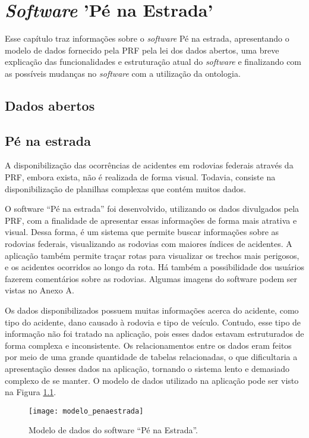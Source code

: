 \chapter{\textit{Software} 'Pé na Estrada'}
  
  Esse capítulo traz informações sobre o \textit{software} Pé na estrada, apresentando o modelo de dados fornecido pela PRF
  pela lei dos dados abertos, uma breve explicação das funcionalidades e estruturação atual do \textit{software} e finalizando 
  com as possíveis mudanças no \textit{software} com a utilização da ontologia.
  
  \section{Dados abertos}
  
    
  
  \section{Pé na estrada}
    A disponibilização das ocorrências de acidentes em rodovias federais através da PRF,
    embora exista, não é realizada de forma visual. Todavia, consiste na disponibilização de
    planilhas complexas que contém muitos dados.

    O software “Pé na estrada” foi desenvolvido, utilizando os dados divulgados pela
    PRF, com a finalidade de apresentar essas informações de forma mais atrativa e visual. Dessa
    forma, é um sistema que permite buscar informações sobre as rodovias federais, visualizando
    as rodovias com maiores índices de acidentes. A aplicação também permite traçar rotas para
    visualizar os trechos mais perigosos, e os acidentes ocorridos ao longo da rota. Há também a
    possibilidade dos usuários fazerem comentários sobre as rodovias. Algumas imagens do
    software podem ser vistas no Anexo A.

    Os dados disponibilizados possuem muitas informações acerca do acidente, como tipo
    do acidente, dano causado à rodovia e tipo de veículo. Contudo, esse tipo de informação não
    foi tratado na aplicação, pois esses dados estavam estruturados de forma complexa e
    inconsistente. Os relacionamentos entre os dados eram feitos por meio de uma grande
    quantidade de tabelas relacionadas, o que dificultaria a apresentação desses dados na
    aplicação, tornando o sistema lento e demasiado complexo de se manter. O modelo de dados
    utilizado na aplicação pode ser visto na Figura \ref{fig:modelo_penaestrada}.

    \begin{figure}[!htb]
    \centering
    \texttt{[image: modelo\_penaestrada]}
    \caption[Modelo de dados do \textit{software} “Pé na Estrada”]{Modelo de dados do software “Pé na Estrada”.}
    \label{fig:modelo_penaestrada}
    \end{figure}

      
  
